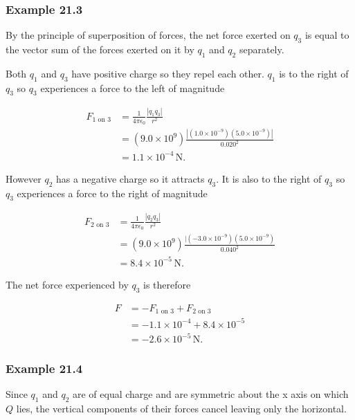 \documentclass{article}
\begin{document}
\subsubsection{Example 21.3}

By the principle of superposition of forces, the net force exerted on $q_3$ is equal to the vector sum of the forces exerted on it by $q_1$ and $q_2$ separately.

Both $q_1$ and $q_3$ have positive charge so they repel each other. $q_1$ is to the right of $q_3$ so $q_3$ experiences a force to the left of magnitude

\begin{align*}
  F_\textrm{1 on 3} & = \frac{1}{4\pi\epsilon_0}\frac{|q_1q_3|}{r^2}                                \\
                    & = (9.0 \times 10^9)\frac{|(1.0 \times 10^{-9})(5.0 \times 10^{-9})|}{0.020^2} \\
                    & = 1.1 \times 10^{-4}\,\textrm{N}.
\end{align*}

However $q_2$ has a negative charge so it attracts $q_3$. It is also to the right of $q_3$ so $q_3$ experiences a force to the right of magnitude

\begin{align*}
  F_\textrm{2 on 3} & = \frac{1}{4\pi\epsilon_0}\frac{|q_2q_3|}{r^2}                                \\
                    & = (9.0 \times 10^9)\frac{|(-3.0 \times 10^{-9})(5.0 \times 10^{-9})}{0.040^2} \\
                    & = 8.4 \times 10^{-5}\,\textrm{N}.
\end{align*}

The net force experienced by $q_3$ is therefore

\begin{align*}
  F & = -F_\textrm{1 on 3} + F_\textrm{2 on 3}   \\
    & = -1.1 \times 10^{-4} + 8.4 \times 10^{-5} \\
    & = -2.6 \times 10^{-5}\,\textrm{N}.
\end{align*}

\subsubsection{Example 21.4}

Since $q_1$ and $q_2$ are of equal charge and are symmetric about the x axis on which $Q$ lies, the vertical components of their forces cancel leaving only the horizontal.
\end{document}
